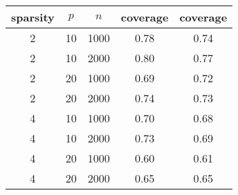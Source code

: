 \begin{table}[ht]
\centering
\begin{tabular}{|ccc|cc|}
  \hline
sparsity & $p$ & $n$ & coverage & coverage \\ 
  \hline
2 & 10 & 1000 & 0.78 & 0.74 \\ 
  2 & 10 & 2000 & 0.80 & 0.77 \\ 
  2 & 20 & 1000 & 0.69 & 0.72 \\ 
  2 & 20 & 2000 & 0.74 & 0.73 \\ 
   \hline
4 & 10 & 1000 & 0.70 & 0.68 \\ 
  4 & 10 & 2000 & 0.73 & 0.69 \\ 
  4 & 20 & 1000 & 0.60 & 0.61 \\ 
  4 & 20 & 2000 & 0.65 & 0.65 \\ 
   \hline
\end{tabular}
\end{table}
